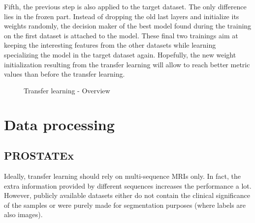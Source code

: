 Fifth, the previous step is also applied to the target dataset. The only difference lies in the frozen part. Instead of dropping the old last layers and initialize its weights randomly, the decision maker of the best model found during the training on the first dataset is attached to the model. These final two trainings aim at keeping the interesting features from the other datasets while learning specializing the model in the target dataset again. Hopefully, the new weight initialization resulting from the transfer learning will allow to reach better metric values than before the transfer learning. 

\begin{figure}[!h]
\centering
\noindent
{}
\caption{Transfer learning - Overview}
\label{fig:tl_overview}
\end{figure}


\section{Data processing}
\subsection{PROSTATEx}
\label{sec:PROSTATEx}
\setlength{\marginparwidth}{3cm}\leavevmode {}Ideally, transfer learning should rely on multi-sequence MRIs only. In fact, the extra information provided by different sequences increases the performance a lot. However, publicly available datasets either do not contain the clinical significance of the samples or were purely made for segmentation purposes (where labels are also images). 

